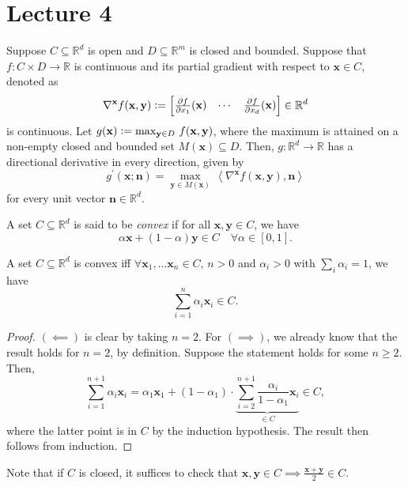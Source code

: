 \section{Lecture 4}

\begin{thm}
    Suppose $C \subseteq \mathbb{R}^d$ is open and $D \subseteq \mathbb{R}^m$ is closed and bounded. Suppose that $f \colon C \times D \to \mathbb{R}$ is continuous and its partial gradient with respect to $\mathbf{x} \in C$, denoted as
    \[
        \nabla^{\mathbf{x}} f(\mathbf{x}, \mathbf{y}) \vcentcolon= \begin{bmatrix}
            \frac{\partial f}{\partial x_1}(\mathbf{x}) & \cdots & \frac{\partial f}{\partial x_d}(\mathbf{x})
        \end{bmatrix} \in \mathbb{R}^d
    \]
    is continuous. Let $g(\mathbf{x}) \vcentcolon= \max_{\mathbf{y} \in D} \, f(\mathbf{x}, \mathbf{y})$, where the maximum is attained on a non-empty closed and bounded set $M(\mathbf{x}) \subseteq D$. Then, $g \colon \mathbb{R}^d \to \mathbb{R}$ has a directional derivative in every direction, given by
    \[
        g^{\prime}(\mathbf{x} ; \mathbf{n}) = \max_{\mathbf{y} \in M(\mathbf{x})} \, \left\langle \nabla^{\mathbf{x}} f(\mathbf{x}, \mathbf{y}), \mathbf{n} \right\rangle
    \]
    for every unit vector $\mathbf{n} \in \mathbb{R}^d$. 
\end{thm}

\begin{defn}
    A set $C \subseteq \mathbb{R}^d$ is said to be \emph{convex} if for all $\mathbf{x}, \mathbf{y} \in C$, we have
    \[
        \alpha\mathbf{x} + (1-\alpha)\mathbf{y} \in C \quad \forall \alpha \in [0,1].
    \]
\end{defn}

\begin{prop}
    A set $C \subseteq \mathbb{R}^d$ is convex iff $\forall \mathbf{x}_1, \ldots \mathbf{x}_n \in C$, $n > 0$ and $\alpha_i > 0$ with $\sum_i \alpha_i = 1$, we have
    \[
        \sum_{i=1}^n \alpha_i \mathbf{x}_i \in C.
    \]
\end{prop}
\begin{proof}
    $(\impliedby)$ is clear by taking $n = 2$. For $(\implies)$, we already know that the result holds for $n = 2$, by definition. Suppose the statement holds for some $n \geq 2$. Then, 
    \[
        \sum_{i=1}^{n+1} \alpha_i \mathbf{x}_i = \alpha_1 \mathbf{x}_1 + (1-\alpha_1) \cdot \underbrace{\sum_{i=2}^{n+1} \frac{\alpha_i}{1-\alpha_1} \mathbf{x}_i}_{\in C} \in C,
    \]
    where the latter point is in $C$ by the induction hypothesis. The result then follows from induction.
\end{proof}
Note that if $C$ is closed, it suffices to check that $\mathbf{x}, \mathbf{y} \in C \implies \frac{\mathbf{x} + \mathbf{y}}{2} \in C$. 

